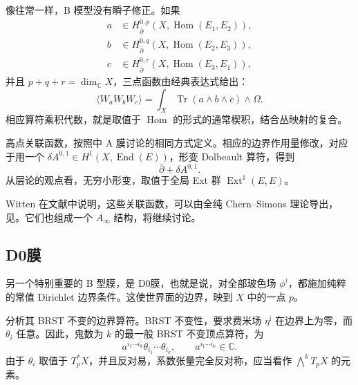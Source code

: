 像往常一样，B 模型没有瞬子修正。如果
\begin{equation}\label{eq:3.192}
\begin{aligned}
a&\in H^{0,p}_{\bar\partial}(X,\operatorname{Hom}(E_1,E_2)),\\
b&\in H^{0,q}_{\bar\partial}(X,\operatorname{Hom}(E_2,E_3)),\\
c&\in H^{0,r}_{\bar\partial}(X,\operatorname{Hom}(E_3,E_1)),
\end{aligned}
\end{equation}
并且 $p+q+r=\dim_{\mathbb{C}}X$，三点函数由经典表达式给出：
\begin{equation}\label{eq:3.193}
\langle W_aW_bW_c\rangle
=\int_X\operatorname{Tr}(a\wedge b\wedge c)\wedge\Omega.
\end{equation}
相应算符乘积代数，就是取值于 $\operatorname{Hom}$ 的形式的通常楔积，结合丛映射的复合。

高点关联函数，按照中 A 膜讨论的相同方式定义。相应的边界作用量修改，对应于用一个 $\delta A^{0,1}\in H^1(X,\operatorname{End}(E))$，形变 Dolbeault 算符，得到
\[
\bar\partial+\delta A^{0,1}.
\]
从层论的观点看，无穷小形变，取值于全局 Ext 群 $\operatorname{Ext}^1(E,E)$。

Witten 在文献中说明，这些关联函数，可以由全纯 Chern--Simons 理论导出，见。它们也组成一个 $A_\infty$ 结构，将继续讨论。

\subsection{D0膜}\label{sec:3.6.5}

另一个特别重要的 B 型膜，是 D0膜，也就是说，对全部玻色场 $\phi^i$，都施加纯粹的常值 Dirichlet 边界条件。这使世界面的边界，映到 $X$ 中的一点 $p$。

分析其 BRST 不变的边界算符。BRST 不变性，要求费米场 $\eta^{\bar\imath}$ 在边界上为零，而 $\theta_i$ 任意。因此，鬼数为 $k$ 的最一般 BRST 不变顶点算符，为
\begin{equation}\label{eq:3.194}
a^{i_1\cdots i_k}\theta_{i_1}\cdots\theta_{i_k},
\qquad a^{i_1\cdots i_k}\in\mathbb{C}.
\end{equation}
由于 $\theta_i$ 取值于 $T_p^*X$，并且反对易，系数张量完全反对称，应当看作 $\bigwedge^kT_pX$ 的元素。


